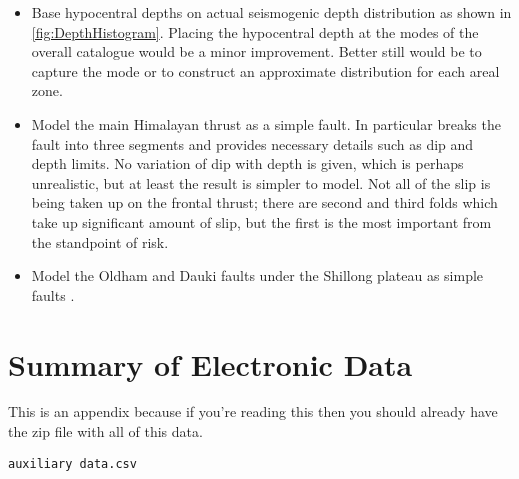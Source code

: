 \documentclass{article}
\begin{document}
\begin{appendices}
\begin{itemize}
\item Base hypocentral depths on actual seismogenic depth distribution as shown in \autoref{fig:DepthHistogram}.
Placing the hypocentral depth at the modes of the overall catalogue would be a minor improvement.
Better still would be to capture the mode or to construct an approximate distribution for each areal zone.
\item Model the main Himalayan thrust as a simple fault.
In particular \cite{berryman2014himalayan} breaks the fault into three segments and provides necessary details such as dip and depth limits.
No variation of dip with depth is given, which is perhaps unrealistic, but at least the result is simpler to model.
Not all of the slip is being taken up on the frontal thrust; there are second and third folds which take up significant amount of slip, but the first is the most important from the standpoint of risk.
\item Model the Oldham and Dauki faults under the Shillong plateau as simple faults \citep{Bilham2001}.
\end{itemize}

\section{Summary of Electronic Data}
\label{app:Jobs}

This is an appendix because if you're reading this then you should already have the zip file with all of this data.

\texttt{auxiliary data.csv} 



\end{appendices}
\end{document}
